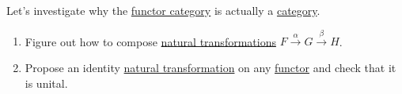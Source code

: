 Let's investigate why the \hyperref[D3.54]{functor category} is actually a \hyperref[D3.6]{category}.
    \begin{enumerate}
      \item Figure out how to compose \hyperref[D3.49]{natural transformations} $F \xrightarrow{\alpha} G \xrightarrow{\beta}H$.
      \item Propose an identity \hyperref[D3.49]{natural transformation} on any \hyperref[D3.35]{functor} and check that it is unital.
    \end{enumerate}